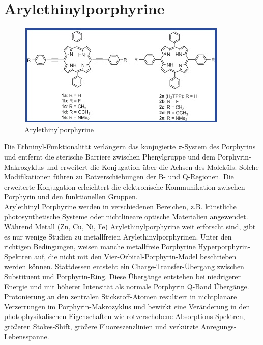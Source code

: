 \section{Arylethinylporphyrine}
\begin{figure}[!htpb]
\centering
\includegraphics[scale=1]{graphics/arylethinylporphyrin}
\caption{Arylethinylporphyrine}
\end{figure}
Die Ethninyl-Funktionalität verlängern das konjugierte $\pi$-System des Porphyrins und entfernt die sterische Barriere zwischen Phenylgruppe und dem Porphyrin-Makrozyklus und erweitert die Konjugation über die Achsen des Moleküls. Solche Modifikationen führen zu Rotverschiebungen der B- und Q-Regionen. Die erweiterte Konjugation erleichtert die elektronische Kommunikation zwischen Porphyrin und den funktionellen Gruppen.
\\Arylethinyl Porphyrine werden in verschiedenen Bereichen, z.B. künstliche photosynthetische Systeme oder nichtlineare optische Materialien angewendet. Während Metall (Zn, Cu, Ni, Fe) Arylethinylporphyrine weit erforscht sind, gibt es nur wenige Studien zu metallfreien Arylethinylporphyrinen. Unter den richtigen Bedingungen, weisen manche metallfreie Porphyrine Hyperporphyrin-Spektren auf, die nicht mit den Vier-Orbital-Porphyrin-Model beschrieben werden können. Stattdessen entsteht ein Charge-Transfer-Übergang zwischen Substituent und Porphyrin-Ring. Diese Übergänge entstehen bei niedrigerer Energie und mit höherer Intensität als normale Porphyrin Q-Band Übergänge. 
\\Protonierung an den zentralen Stickstoff-Atomen resultiert in nichtplanare Verzerrungen im Porphyrin-Makrozyklus und bewirkt eine Veränderung in den photophysikalischen Eigenschaften wie rotverschobene Absorptions-Spektren, größeren Stokes-Shift, größere Fluoreszenzlinien und verkürzte Anregungs-Lebensspanne. \cite{[9]}
